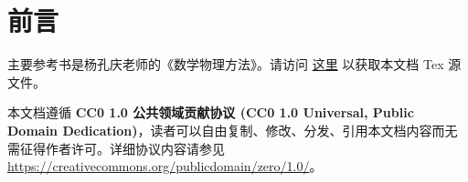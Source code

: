 \chapter*{前言} %

主要参考书是杨孔庆老师的《数学物理方法》\cite{杨孔庆2012数学物理方法}。请访问 \href{https://github.com/BeiHai0/Surviving-LZU-Physics/tree/master/%E5%B0%8F%E7%8F%AD%E8%AE%B2%E4%B9%89/%E6%95%B0%E5%AD%A6%E7%89%A9%E7%90%86%E6%96%B9%E6%B3%951%E5%B0%8F%E7%8F%AD%E8%AE%B2%E4%B9%89}{这里} 以获取本文档 Tex 源文件。

本文档遵循 \textbf{CC0 1.0 公共领域贡献协议 (CC0 1.0 Universal, Public Domain Dedication)}，读者可以自由复制、修改、分发、引用本文档内容而无需征得作者许可。详细协议内容请参见 \url{https://creativecommons.org/publicdomain/zero/1.0/}。
